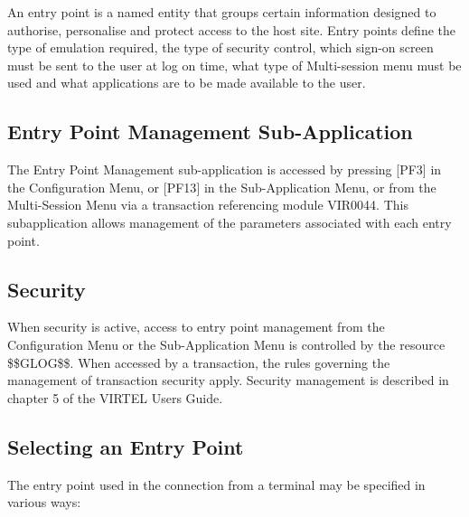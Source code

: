 \documentclass[letterpaper,10pt,english]{sphinxmanual}
\begin{document}
An entry point is a named entity that groups certain information designed to authorise, personalise and protect access to the host site. Entry points define the type of emulation required, the type of security control, which sign-on screen must be sent to the user at log on time, what type of Multi-session menu must be used and what applications are to be made available to the user.


\subsection{Entry Point Management Sub-Application}
\label{\detokenize{connectivity_guide:index-103}}\label{\detokenize{connectivity_guide:entry-point-management-sub-application}}
The Entry Point Management sub-application is accessed by pressing {[}PF3{]} in the Configuration Menu, or {[}PF13{]} in the Sub-Application Menu, or from the Multi-Session Menu via a transaction referencing module VIR0044. This subapplication allows management of the parameters associated with each entry point.


\subsection{Security}
\label{\detokenize{connectivity_guide:id55}}\label{\detokenize{connectivity_guide:index-104}}
When security is active, access to entry point management from the Configuration Menu or the Sub-Application Menu is controlled by the resource \$\$GLOG\$\$. When accessed by a transaction, the rules governing the management of transaction security apply. Security management is described in chapter 5 of the VIRTEL Users Guide.


\subsection{Selecting an Entry Point}
\label{\detokenize{connectivity_guide:selecting-an-entry-point}}\label{\detokenize{connectivity_guide:index-105}}
The entry point used in the connection from a terminal may be specified in various ways:
\end{document}
